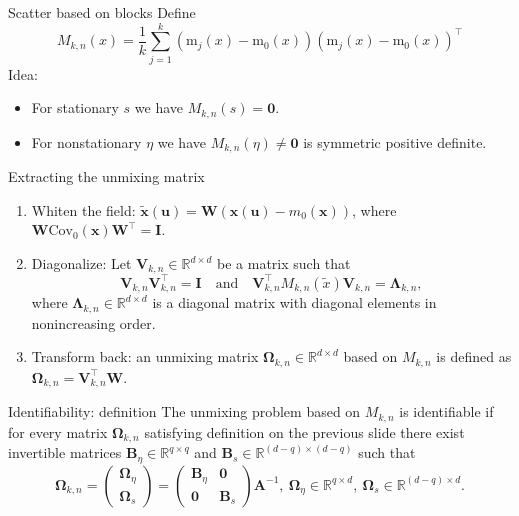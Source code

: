 \documentclass{beamer}
\begin{document}
\begin{frame}{Scatter based on blocks}
  Define
  \begin{equation*}
    M_{k, n}(x) = \frac{1}{k}\sum_{j = 1}^k \left(\mathrm{m}_j(x)
    - \mathrm{m}_0(x)\right)
    \left(\mathrm{m}_j(x) - \mathrm{m}_0(x)\right)^\intercal
  \end{equation*}
  \pause
  Idea:
  \begin{itemize}
    \item For stationary $s$ we have $M_{k, n}(s) = \bm 0$.
    \item For nonstationary $\eta$ we have $M_{k, n}(\eta) \neq \bm 0$ is
    symmetric positive definite.
  \end{itemize}
\end{frame}


\begin{frame}{Extracting the unmixing matrix}
  \begin{enumerate}
    \item Whiten the field: $\tilde{\bm x}(\bm u) = \bm W\left(\bm x(\bm u) -
    m_0(\bm x)\right)$, where $\bm W\mathrm{Cov}_0(\bm x)\bm W^\intercal = \bm
    I$.
    \pause
    \item Diagonalize: Let $\bm V_{k, n}\in\mathbb{R}^{d\times d}$ be a
    matrix such that
    \begin{equation*}
      \bm V_{k, n} \bm V_{k, n}^\intercal
      = \bm I
      \quad\text{and}\quad
      \bm V_{k, n}^\intercal M_{k, n}(\tilde{x})
      \bm V_{k, n} = \bm \Lambda_{k, n},
    \end{equation*}
    where $\bm\Lambda_{k, n}\in\mathbb{R}^{d\times d}$ is a diagonal matrix with
    diagonal elements in nonincreasing order.
    \pause
    \item Transform back: an unmixing matrix $\bm\Omega_{k,
    n}\in\mathbb{R}^{d\times d}$ based on $M_{k, n}$ is defined as
    $\bm\Omega_{k, n} = \bm V_{k, n}^\intercal \bm W$.
  \end{enumerate} 
\end{frame}


\begin{frame}{Identifiability: definition}
  The unmixing problem based on $M_{k, n}$ is identifiable if for every matrix
  $\bm\Omega_{k,n}$ satisfying definition on the previous slide there exist
  invertible matrices $\bm B_\eta\in\mathbb{R}^{q\times q}$ and $\bm
  B_s\in\mathbb{R}^{(d - q)\times (d - q)}$ such that
  \begin{equation*}
    \bm\Omega_{k,n} = 
    \begin{pmatrix}
      \bm\Omega_\eta \\ \bm\Omega_s
    \end{pmatrix} =
    \begin{pmatrix}
      \bm B_\eta & \bm 0 \\
      \bm 0 & \bm B_s
    \end{pmatrix}
    \bm A^{-1},\ \bm\Omega_\eta\in\mathbb{R}^{q\times d},\
    \bm\Omega_s\in\mathbb{R}^{(d-q)\times d}.
  \end{equation*}
\end{frame}
\end{document}
